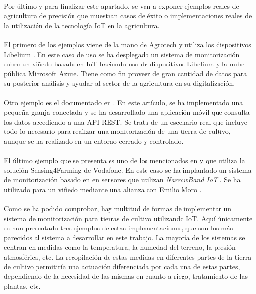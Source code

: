 \documentclass[../../memoria.tex]{subfiles}
\begin{document}
\paragraph{}
Por último y para finalizar este apartado, se van a exponer ejemplos reales de agricultura de precisión que muestran casos de éxito o implementaciones reales de la utilización de la tecnología IoT en la agricultura.

\paragraph{}
El primero de los ejemplos viene de la mano de Agrotech y utiliza los dispositivos Libelium \cite{libeliumusecase1}. En este caso de uso se ha desplegado un sistema de monitorización sobre un viñedo basado en IoT haciendo uso de dispositivos Libelium y la nube pública Microsoft Azure. Tiene como fin proveer de gran cantidad de datos para su posterior análisis y ayudar al sector de la agricultura en su digitalización.

\paragraph{}
Otro ejemplo es el documentado en \cite{inproceedings}. En este artículo, se ha implementado una pequeña granja conectada y se ha desarrollado una aplicación móvil que consulta los datos accediendo a una API REST. Se trata de un escenario real que incluye todo lo necesario para realizar una monitorización de una tierra de cultivo, aunque se ha realizado en un entorno cerrado y controlado.

\paragraph{}
El último ejemplo que se presenta es uno de los mencionados en \cite{vodafones} y que utiliza la solución Sensing4Farming de Vodafone. En este caso se ha implantado un sistema de monitorización basado en en sensores que utilizan \textit{NarrowBand IoT} \cite{narrowband}. Se ha utilizado para un viñedo mediante una alianza con Emilio Moro \cite{emiliomoro}.

\paragraph{}
Como se ha podido comprobar, hay multitud de formas de implementar un sistema de monitorización para tierras de cultivo utilizando IoT. Aquí únicamente se han presentado tres ejemplos de estas implementaciones, que son los más parecidos al sistema a desarrollar en este trabajo. La mayoría de los sistemas se centran en medidas como la temperatura, la humedad del terreno, la presión atmosférica, etc. La recopilación de estas medidas en diferentes partes de la tierra de cultivo permitiría una actuación diferenciada por cada una de estas partes, dependiendo de la necesidad de las mismas en cuanto a riego, tratamiento de las plantas, etc.
\end{document}
